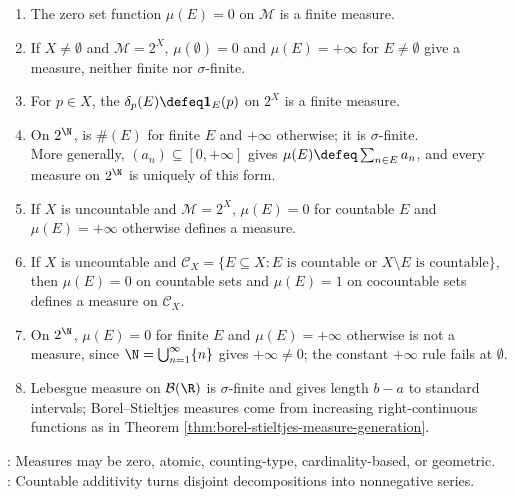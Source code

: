 \begin{example} \label{ex:first-abstract-measures} 
\begin{enumerate}[label=(\roman*)]
\setlength{\itemsep}{0pt}
\item The zero set function $\mu(E)=0$ on $\mathcal{M}$ is a finite measure.
\item If $X\neq\emptyset$ and $\mathcal{M}=2^X$, $\mu(\emptyset)=0$ and $\mu(E)=+\infty$ for $E\neq\emptyset$ give a measure, neither finite nor $\sigma$-finite.
\item For $p\in X$, the  $\delta_p(E)\defeq\mathbf{1}_E(p)$ on $2^X$ is a finite measure.
\item On $2^\N$,  is $\#(E)$ for finite $E$ and $+\infty$ otherwise; it is $\sigma$-finite.\\
More generally, $(a_n)\subseteq[0,+\infty]$ gives $\mu(E)\defeq\sum_{n\in E}a_n$, and every measure on $2^\N$ is uniquely of this form.
\item If $X$ is uncountable and $\mathcal{M}=2^X$, $\mu(E)=0$ for countable $E$ and $\mu(E)=+\infty$ otherwise defines a measure.
\item If $X$ is uncountable and $\mathcal{C}_X=\{E\subseteq X:E\text{ is countable or }X\setminus E\text{ is countable}\}$, then
$\mu(E)=0$ on countable sets and $\mu(E)=1$ on cocountable sets defines a measure on $\mathcal{C}_X$.
\item On $2^\N$, $\mu(E)=0$ for finite $E$ and $\mu(E)=+\infty$ otherwise is not a measure, since $\N=\bigcup_{n=1}^{\infty}\{n\}$ gives $+\infty\neq0$; the constant $+\infty$ rule fails at $\emptyset$.
\item Lebesgue measure on $\mathcal{B}(\R)$ is $\sigma$-finite and gives length $b-a$ to standard intervals; Borel--Stieltjes measures come from increasing right-continuous functions as in Theorem \ref{thm:borel-stieltjes-measure-generation}.
\end{enumerate}
: Measures may be zero, atomic, counting-type, cardinality-based, or geometric.\\
: Countable additivity turns disjoint decompositions into nonnegative series.
\end{example}


